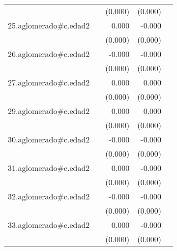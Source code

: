 {\begin{longtable}{l*{4}{D{.}{.}{-1}}}
            &                     &     (0.000)         &     (0.000)         &                     \\
\addlinespace
25.aglomerado#c.edad2&                     &       0.000         &      -0.000         &                     \\
            &                     &     (0.000)         &     (0.000)         &                     \\
\addlinespace
26.aglomerado#c.edad2&                     &      -0.000         &      -0.000\sym{**} &                     \\
            &                     &     (0.000)         &     (0.000)         &                     \\
\addlinespace
27.aglomerado#c.edad2&                     &       0.000\sym{*}  &       0.000         &                     \\
            &                     &     (0.000)         &     (0.000)         &                     \\
\addlinespace
29.aglomerado#c.edad2&                     &       0.000\sym{**} &       0.000         &                     \\
            &                     &     (0.000)         &     (0.000)         &                     \\
\addlinespace
30.aglomerado#c.edad2&                     &      -0.000         &      -0.000\sym{***}&                     \\
            &                     &     (0.000)         &     (0.000)         &                     \\
\addlinespace
31.aglomerado#c.edad2&                     &       0.000         &      -0.000\sym{**} &                     \\
            &                     &     (0.000)         &     (0.000)         &                     \\
\addlinespace
32.aglomerado#c.edad2&                     &      -0.000         &      -0.000\sym{***}&                     \\
            &                     &     (0.000)         &     (0.000)         &                     \\
\addlinespace
33.aglomerado#c.edad2&                     &       0.000         &      -0.000\sym{**} &                     \\
            &                     &     (0.000)         &     (0.000)         &                     \\

\end{longtable}}
